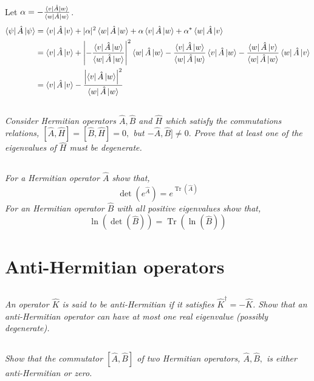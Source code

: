 \documentclass[12pt, letterpaper]{article}
\begin{document}
Let $\alpha = -\frac{\bra{v}\hat A \ket w}{\bra w \hat A \ket w}$.
\begin{align*}
    \bra\psi \hat A \ket\psi& =\bra v\hat{A} \ket v+|\alpha|^{2} \bra w \hat{A}  \ket w + \alpha \bra  v\hat A \ket w+\alpha^{*}\bra w\hat{A} \ket v\\
    & =\bra v\hat{A} \ket v+\left| -\frac{\bra{v}\hat A \ket w}{\bra w \hat A \ket w}\right|^{2} \bra w \hat{A}  \ket w  -\frac{\bra{v}\hat A \ket w}{\bra w \hat A \ket w} \bra  v\hat A \ket w -\frac{\bra{w}\hat A \ket v}{\bra w \hat A \ket w}\bra w\hat{A} \ket v \\
    &= \bra v\hat{A} \ket v - \frac{\left|\bra v \hat A \ket w \right|^2}{\bra w \hat A \ket w}
\end{align*}
    
\subsection{}
\textit{Consider Hermitian operators $\hat{A}, \hat{B}$ and $\hat{H}$ which satisfy the commutations relations, $[\hat{A}, \hat{H}]=[\hat{B}, \hat{H}]=0,$ but $-\hat{A}, \hat{B}] \neq 0 .$ Prove that at least one of the eigenvalues of $\hat{H}$ must be degenerate.}


\subsection{}
\textit{For a Hermitian operator $\hat{A}$ show that,
$$
\operatorname{det}\left(e^{\hat{A}}\right)=e^{\operatorname{Tr}(\hat{A})}
$$
For an Hermitian operator $\hat{B}$ with all positive eigenvalues show that,
$$
\ln (\operatorname{det}(\hat{B}))=\operatorname{Tr}(\ln (\hat{B}))
$$
}

\section{Anti-Hermitian operators}
\subsection{}
\textit{An operator $\hat{K}$ is said to be anti-Hermitian if it satisfies $\hat{K}^{\dagger}=-\hat{K}$. Show that an anti-Hermitian operator can have at most one real eigenvalue (possibly degenerate).}

\subsection{}
\textit{Show that the commutator $[\hat{A}, \hat{B}]$ of two Hermitian operators, $\hat{A}, \hat{B},$ is either anti-Hermitian or zero.}
\end{document}
